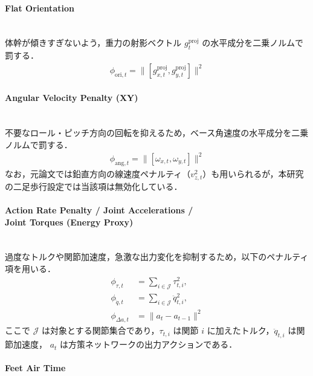 \paragraph{Flat Orientation}\quad\\

体幹が傾きすぎないよう，重力の射影ベクトル $g^{\mathrm{proj}}_t$ の水平成分を二乗ノルムで罰する．
\begin{align}
  \phi_{\mathrm{ori},t} = \|[g^{\mathrm{proj}}_{x,t}, g^{\mathrm{proj}}_{y,t}]\|^2
  \label{eq:task_flat_ori}
\end{align}

\paragraph{Angular Velocity Penalty (XY)}\quad\\

不要なロール・ピッチ方向の回転を抑えるため，ベース角速度の水平成分を二乗ノルムで罰する．
\begin{align}
  \phi_{\mathrm{ang},t} = \|[\omega_{x,t}, \omega_{y,t}]\|^2
  \label{eq:task_ang_vel_xy}
\end{align}
なお，元論文では鉛直方向の線速度ペナルティ（$v_{z,t}^2$）も用いられるが，本研究の二足歩行設定では当該項は無効化している．

\paragraph{Action Rate Penalty / Joint Accelerations / \\ Joint Torques (Energy Proxy)}\quad\\

過度なトルクや関節加速度，急激な出力変化を抑制するため，以下のペナルティ項を用いる．
\begin{align}
  \phi_{\tau,t} &= \sum_{i\in\mathcal{J}} \tau_{t,i}^2, \\
  \phi_{\ddot{q},t} &= \sum_{i\in\mathcal{J}} \ddot{q}_{t,i}^2, \\
  \phi_{\Delta a,t} &= \|a_t - a_{t-1}\|^2
  \label{eq:task_regs}
\end{align}
ここで $\mathcal{J}$ は対象とする関節集合であり，$\tau_{t,i}$ は関節 $i$ に加えたトルク，$\ddot{q}_{t,i}$ は関節加速度，
$a_t$ は方策ネットワークの出力アクションである．

\paragraph{Feet Air Time}\quad\\

